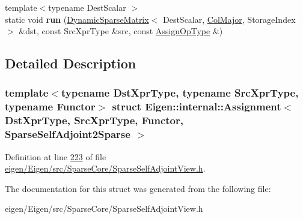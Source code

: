 \begin{DoxyCompactItemize}
\mbox{\label{struct_eigen_1_1internal_1_1_assignment_3_01_dst_xpr_type_00_01_src_xpr_type_00_01_functor_00_017b35cf78061a31c93b838bddfa619fa3_aa06877715605088e5832b54bf5a23ea1}} 
{\footnotesize template$<$typename Dest\+Scalar $>$ }\\static void {\bfseries run} (\hyperlink{class_eigen_1_1_dynamic_sparse_matrix}{Dynamic\+Sparse\+Matrix}$<$ Dest\+Scalar, \hyperlink{group__enums_ggaacded1a18ae58b0f554751f6cdf9eb13a0cbd4bdd0abcfc0224c5fcb5e4f6669a}{Col\+Major}, Storage\+Index $>$ \&dst, const Src\+Xpr\+Type \&src, const \hyperlink{struct_eigen_1_1internal_1_1assign__op}{Assign\+Op\+Type} \&)
\end{DoxyCompactItemize}


\subsection{Detailed Description}
\subsubsection*{template$<$typename Dst\+Xpr\+Type, typename Src\+Xpr\+Type, typename Functor$>$\newline
struct Eigen\+::internal\+::\+Assignment$<$ Dst\+Xpr\+Type, Src\+Xpr\+Type, Functor, Sparse\+Self\+Adjoint2\+Sparse $>$}



Definition at line \hyperlink{eigen_2_eigen_2src_2_sparse_core_2_sparse_self_adjoint_view_8h_source_l00223}{223} of file \hyperlink{eigen_2_eigen_2src_2_sparse_core_2_sparse_self_adjoint_view_8h_source}{eigen/\+Eigen/src/\+Sparse\+Core/\+Sparse\+Self\+Adjoint\+View.\+h}.



The documentation for this struct was generated from the following file\+:\begin{DoxyCompactItemize}
\item 
eigen/\+Eigen/src/\+Sparse\+Core/\+Sparse\+Self\+Adjoint\+View.\+h\end{DoxyCompactItemize}
